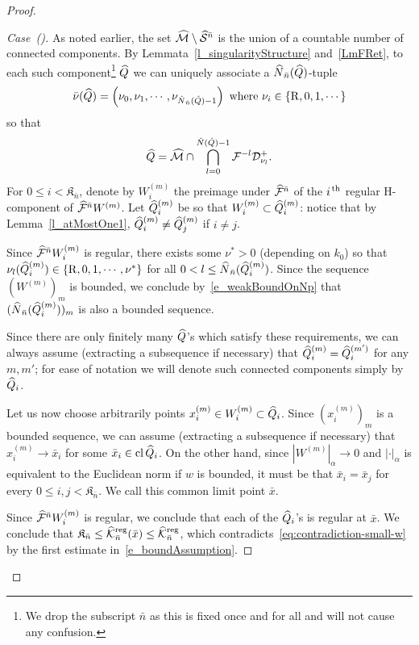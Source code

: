 \documentclass[AHL, Unicode, longabstracts,published]{cedram}
\newcommand{\cl}[1]{\mathrm{cl}\,#1}
\newcommand{\cm}{\mathcal{F}}
\newcommand{\cell}{\mathcal{D}}
\newcommand{\csp}{\mathcal{M}}
\newcommand{\cmp}{\hat\cm}
\newcommand{\cspi}{\widehat{\csp}}
\newcommand{\brn}{\bar{n}}
\newcommand{\Hcomp}{H-\hskip0pt component}
\newcommand{\recoPrivate}{\mathrm{R}}
\newcommand{\singPrivate}{\mathcal{S}}
\newcommand{\singp}[1]{\hat{\singPrivate}^{#1}}
\newcommand{\cc}{\hat Q}
\newcommand{\ccseq}[1]{\privSeq\cc{#1}}
\newcommand{\xseq}[1]{\privSeq x{#1}}
\newcommand{\indTuple}{\bar\indCell}
\newcommand{\ckregp}{\hat{\mathcal{K}}^\text{reg}}
\newcommand{\adm}{_{\alpha^{+}}}
\newcommand{\Np}{\hat N}
\newcommand{\indCell}{\nu}
\newcommand{\redCell}{{\indCell^*}}
\newcommand{\privSeq}[2]{#1^{(#2)}}
\newcommand{\Wseq}[1]{\privSeq{W}{#1}}
\newcommand*\Kn{{\mathfrak{K}_{\brn}}}
\renewcommand{\adm}{_{\alpha}}
\newcounter{casecount}
\renewcommand*\thecasecount{(\alph{casecount})}
\newenvironment{case}{\refstepcounter{casecount}\begin{proof}[{Case~\thecasecount}]}{\let\qed\relax\end{proof}}
\let\oldhat\hat
\renewcommand*{\hat}[1]{\mathchoice{\widehat{#1}}{\widehat{#1}}{\oldhat{#1}}{\oldhat{#1}}}
\begin{document}
\begin{proof}
\begin{case}
As noted earlier, the set $\cspi\setminus\singp{\brn}$ is the union of a countable number of connected components. By Lemmata~\ref{l_singularityStructure} and~\ref{LmFRet}, to each such component\footnote{We drop the subscript $\brn$ as this is fixed once and for all and will not cause any confusion.} $\cc$ we can uniquely associate a $\Np_{\brn}(\cc)$-tuple
\begin{align*}
\indTuple(\cc) = \left(\indCell_0,\indCell_1,\cdots,\indCell_{\Np_{\brn}(\cc)-1}\right)
\textrm{ where } \indCell_i\in\{\recoPrivate,0,1,\cdots\}
\end{align*}
so that
\begin{align*}
\cc = \cspi \cap \bigcap_{l = 0}^{\Np(\cc)-1}\cm^{-l}\cell^+_{\indCell_l}.
\end{align*}
For $0\le i < \Kn$, denote by $\Wseq{m}_i$ the preimage under $\cmp^{\brn}$ of the $i^{\,\rm th}$ regular \Hcomp{} of $\cmp^{\brn}\Wseq m$. Let $\ccseq{m}_i$ be so that $\Wseq{m}_i\subset\ccseq{m}_i$: notice that by Lemma~\ref{l_atMostOne1}, $\ccseq{m}_i\ne\ccseq{m}_j$ if $i\ne j$.

Since $\cmp^{\brn}\Wseq{m}_i$ is regular, there exists some $\redCell > 0$ (depending on $k_{0}$) so that $\indCell_l(\ccseq{m}_{i}) \in\{\recoPrivate,0,1,\cdots,\redCell\}$ for all $0 < l \le \Np_{\brn}(\ccseq{m}_{i})$. Since the sequence $(\Wseq{m})_m$ is bounded, we conclude by~\eqref{e_weakBoundOnNp} that $(\Np_{\brn}(\ccseq{m}_i))_{m}$ is also a bounded sequence.

Since there are only finitely many $\cc$'s which satisfy these requirements, we can always assume (extracting a subsequence if necessary) that $\ccseq{m}_i = \ccseq{m'}_i$ for any $m,m'$; for ease of notation we will denote such connected components simply by $\cc_i$.

Let us now choose arbitrarily points $\xseq{m}_i\in\Wseq{m}_i\subset\cc_i$. Since $(\xseq{m}_i)_m$ is a bounded sequence, we can assume (extracting a subsequence if necessary) that $\xseq{m}_i\to\bar x_i$ for some $\bar x_i\in\cl\cc_i$. On the other hand, since $|\Wseq{m}|\adm\to0$ and $|\cdot|\adm$ is equivalent to the Euclidean norm if $w$ is bounded, it must be that $\bar x_i = \bar x_j$ for every $0\le i,j < \Kn $. We call this common limit point $\bar x$.

Since $\cmp^{\brn}\Wseq{m}_i$ is regular, we conclude that each of the $\cc_i$'s is regular at $\bar x$. We conclude that $\Kn \leq \ckregp_{\bar n}(\bar x)\leq \ckregp_{\bar n}$, which contradicts~\eqref{eq:contradiction-small-w} by the first estimate in~\eqref{e_boundAssumption}.
\end{case}


\end{proof}
\end{document}
